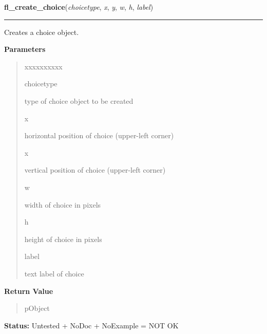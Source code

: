 \hspace{.8\funcindent}\begin{boxedminipage}{\funcwidth}

    \raggedright \textbf{fl\_create\_choice}(\textit{choicetype}, \textit{x}, \textit{y}, \textit{w}, \textit{h}, \textit{label})

    \vspace{-1.5ex}

    \rule{\textwidth}{0.5\fboxrule}
\setlength{\parskip}{2ex}
    Creates a choice object.

\setlength{\parskip}{1ex}
      \textbf{Parameters}
      \vspace{-1ex}

      \begin{quote}
        \begin{Ventry}{xxxxxxxxxx}

          \item[choicetype]

          type of choice object to be created

          \item[x]

          horizontal position of choice (upper-left corner)

          \item[x]

          vertical position of choice (upper-left corner)

          \item[w]

          width of choice in pixels

          \item[h]

          height of choice in pixels

          \item[label]

          text label of choice

        \end{Ventry}

      \end{quote}

      \textbf{Return Value}
    \vspace{-1ex}

      \begin{quote}
      pObject

      \end{quote}

\textbf{Status:} Untested + NoDoc + NoExample = NOT OK



    \end{boxedminipage}

